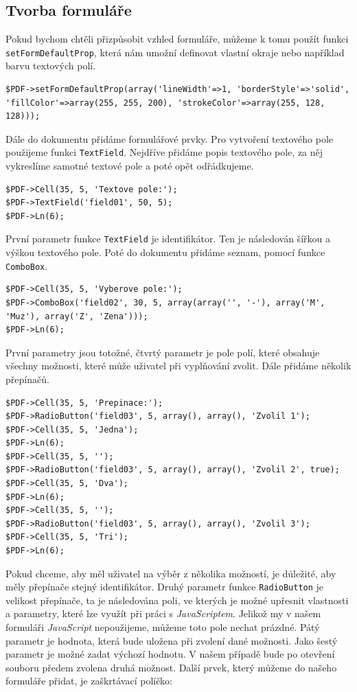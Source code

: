 \documentclass[czech,BP]{thesiskiv}
\begin{document}
\subsection{Tvorba formuláře}
Pokud bychom chtěli přizpůsobit vzhled formuláře, můžeme k tomu použít funkci \texttt{setFormDefaultProp}, která nám umožní definovat vlastní okraje nebo například barvu textových polí. 
\begin{lstlisting}[firstnumber=6]
$PDF->setFormDefaultProp(array('lineWidth'=>1, 'borderStyle'=>'solid', 'fillColor'=>array(255, 255, 200), 'strokeColor'=>array(255, 128, 128)));
\end{lstlisting}
Dále do dokumentu přidáme formulářové prvky. Pro vytvoření textového pole použijeme funkci \texttt{TextField}. Nejdříve přidáme popis textového pole, za něj vykreslíme samotné textové pole a poté opět odřádkujeme.
\begin{lstlisting}[firstnumber=7]
$PDF->Cell(35, 5, 'Textove pole:');
$PDF->TextField('field01', 50, 5);
$PDF->Ln(6);
\end{lstlisting}
První parametr funkce \texttt{TextField} je identifikátor. Ten je následován šířkou a výškou textového pole. Poté do dokumentu přidáme seznam, pomocí funkce \texttt{ComboBox}.
\begin{lstlisting}[firstnumber=10]
$PDF->Cell(35, 5, 'Vyberove pole:');
$PDF->ComboBox('field02', 30, 5, array(array('', '-'), array('M', 'Muz'), array('Z', 'Zena')));
$PDF->Ln(6);
\end{lstlisting}
První parametry jsou totožné, čtvrtý parametr je pole polí, které obsahuje všechny možnosti, které může uživatel při vyplňování zvolit. Dále přidáme několik přepínačů.
\begin{lstlisting}[firstnumber=13]
$PDF->Cell(35, 5, 'Prepinace:');
$PDF->RadioButton('field03', 5, array(), array(), 'Zvolil 1');
$PDF->Cell(35, 5, 'Jedna');
$PDF->Ln(6);
$PDF->Cell(35, 5, '');
$PDF->RadioButton('field03', 5, array(), array(), 'Zvolil 2', true);
$PDF->Cell(35, 5, 'Dva');
$PDF->Ln(6);
$PDF->Cell(35, 5, '');
$PDF->RadioButton('field03', 5, array(), array(), 'Zvolil 3');
$PDF->Cell(35, 5, 'Tri');
$PDF->Ln(6);
\end{lstlisting}
Pokud chceme, aby měl uživatel na výběr z několika možností, je důležité, aby měly přepínače stejný identifikátor. Druhý parametr funkce \texttt{RadioButton} je velikost přepínače, ta je následována poli, ve kterých je možné upřesnit vlastnosti a parametry, které lze využít při práci s \emph{JavaScriptem}. Jelikož my v našem formuláři \emph{JavaScript} nepoužijeme, můžeme toto pole nechat prázdné. Pátý parametr je hodnota, která bude uložena při zvolení dané možnosti. Jako šestý parametr je možné zadat výchozí hodnotu. V našem případě bude po otevření souboru předem zvolena druhá možnost. Další prvek, který můžeme do našeho formuláře přidat, je zaškrtávací políčko:
\end{document}
